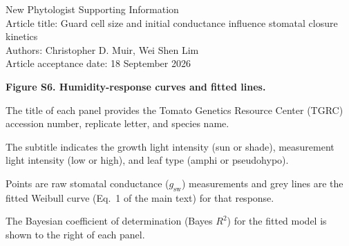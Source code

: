 \documentclass[11pt]{article}
\newcommand{\gsw}{$g_\mathrm{sw}$}
\begin{document}
\noindent New Phytologist Supporting Information\\
Article title: Guard cell size and initial conductance influence stomatal closure kinetics\\
Authors: Christopher D. Muir, Wei Shen Lim\\
Article acceptance date: 18 September 2026

\noindent\textbf{\large Figure S6. Humidity-response curves and fitted lines.}

\noindent The title of each panel provides the Tomato Genetics Resource Center (TGRC) accession number, replicate letter, and species name.

\noindent The subtitle indicates the growth light intensity (sun or shade), measurement light intensity (low or high), and leaf type (amphi or pseudohypo).

\noindent Points are raw stomatal conductance (\gsw) measurements and grey lines are the fitted Weibull curve (Eq.~1 of the main text) for that response.

\noindent The Bayesian coefficient of determination (Bayes $R^2$) for the fitted model is shown to the right of each panel.
\end{document}
